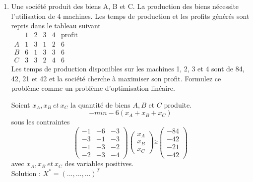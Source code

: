 \begin{enumerate}
\begin{solution}
    \end{solution}


  \item Une société produit des biens A, B et C. La production des biens nécessite l'utilisation de 4 machines. Les temps de production
    et les profits générés sont repris dans le tableau suivant\\

    $
    \begin{array}{l|llll|l}
      & 1 & 2 & 3 & 4 & \mbox{profit}\\
      \hline
      A & 1 & 3 & 1 & 2 & 6\\
      B & 6 & 1 & 3 & 3 & 6\\
      C & 3 & 3 & 2 & 4 & 6
    \end{array}
    $
    \\


    Les temps de production disponibles sur les machines 1, 2, 3 et 4  sont de 84, 42, 21 et 42 et la société cherche à  maximiser son
    profit. Formulez ce problème comme un problème d'optimisation linéaire.

    \begin{solution}
      Soient $x_{A}, x_{B}~et~x_{C}$ la quantité de biens $A, B$ et $C$ produite. \\
      $$- min -6(x_{A} + x_{B} + x_{C})$$
      sous les contraintes \\
      \[
        \begin{pmatrix}
          -1 & -6 & -3\\
          -3 & -1 & -3\\
          -1 & -3 & -2\\
          -2 & -3 & -4
        \end{pmatrix}
        \begin{pmatrix}
          x_{A}\\
          x_{B}\\
          x_{C}
        \end{pmatrix}
        \stackrel{\ge}{}
        \begin{pmatrix}
          -84\\
          -42\\
          -21\\
          -42
        \end{pmatrix}
      \]
      avec $x_{A}, x_{B}~et~x_{C}$ des variables positives.\\
      \newline
      Solution : $X^{*} = (...,...,...)^{T}$


\end{solution}
\end{enumerate}
